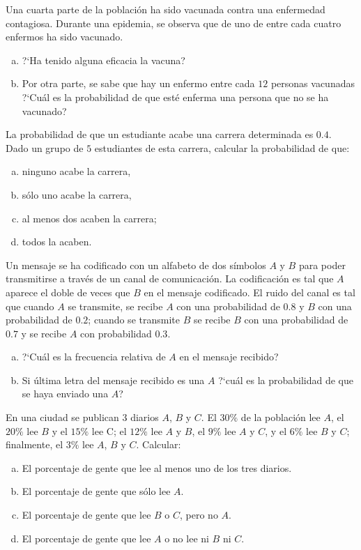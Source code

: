 \documentclass[12pt]{article}
\begin{document}
\probl  Una cuarta parte de la población ha sido  vacunada contra
una enfermedad contagiosa. Durante una epidemia, se observa que de
  uno de entre cada cuatro enfermos ha sido vacunado.
\begin{enumerate}[a)]
\item ?`Ha tenido alguna eficacia la vacuna?
\item Por otra parte, se sabe que hay un enfermo  entre cada $12$ personas
vacunadas ?`Cuál es la probabilidad de que  esté enferma una
persona que no se ha vacunado?
\end{enumerate}

\probl La probabilidad de  que un estudiante  acabe una carrera determinada es $0.4$.
Dado un grupo de $5$ estudiantes de esta carrera, calcular la probabilidad de que:

\begin{enumerate}[a)]
\item  ninguno acabe la carrera,
\item sólo uno acabe la carrera,
\item al menos dos acaben la carrera;
\item todos la acaben.
\end{enumerate}

\probl  Un  mensaje se ha codificado con un alfabeto de dos símbolos $A$ y $B$ para poder
transmitirse a través de un canal de comunicación. La codificación es tal que $A$ aparece
el doble de veces que $B$ en el mensaje codificado. El ruido del canal es tal que cuando
$A$ se transmite, se recibe  $A$ con una probabilidad de $0.8$ y  $B$ con una
probabilidad de  $0.2$; cuando se transmite $B$ se recibe  $B$ con una probabilidad de
$0.7$ y se recibe $A$ con probabilidad $0.3$.
\begin{enumerate}[a)]
\item ?`Cuál es la frecuencia relativa de $A$ en el mensaje recibido?
\item Si última letra del mensaje recibido es una $A$ ?`cuál es la probabilidad de que
 se haya enviado una $A$?
\end{enumerate}

\probl  En una ciudad se publican 3 diarios $A$, $B$ y $C$. El $30
\%$ de la población lee $A$, el $20 \%$ lee $B$ y el $15 \%$ lee
C; el $12 \%$ lee $A$ y $B$, el $9 \%$ lee $A$ y $C$, y el $6 \%$
lee $B$ y $C$; finalmente, el $3 \%$ lee $A$, $B$ y $C$.
Calcular:\
\begin{enumerate}[a)]
\item El porcentaje de gente que lee al menos uno de los tres diarios.
\item El porcentaje de gente que sólo lee $A$.
\item  El porcentaje de gente que lee $B$ o $C$, pero no $A$.
\item  El porcentaje de gente que lee $A$ o no lee ni $B$ ni $C$.
\sol{ \bf{ a) 0.41 ; b) 0.12; c) 0.11; d) 0.89}}
\end{enumerate}
\end{document}
